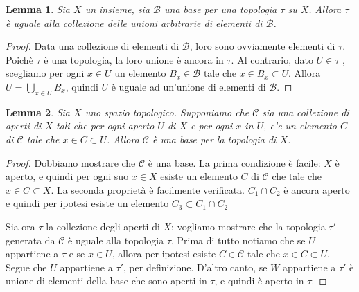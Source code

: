 \documentclass[10pt,a4paper]{article}
\theoremstyle{definition}
\theoremstyle{plain}
\newtheorem{lem}{Lemma}
\theoremstyle{remark}
\newtheorem{rem}{Remark}
\theoremstyle{remark}
\newcommand{\C}{\mathcal{C}}
\newcommand{\B}{\mathcal{B}}
\begin{document}
\begin{lem} Sia $X$ un insieme, sia $\B$ una base per una topologia $\tau$ su
$X$. Allora $\tau$ è uguale alla collezione delle unioni arbitrarie di elementi
di $\B$.
\end{lem}
\begin{proof} Data una collezione di elementi di $\B$, loro sono ovviamente
elementi di $\tau$. Poichè $\tau$ è una topologia, la loro unione è ancora in
$\tau$. Al contrario, dato $U \in \tau$ , scegliamo per ogni $x \in U$ un
elemento $B_x \in \B$ tale che $x \in B_x \subset U$. Allora $U = \bigcup_{x \in
U} B_x$, quindi $U$ è uguale ad un'unione di elementi di $\B$.
\end{proof}

%

\begin{lem}\label{baselem13.2} Sia $X$ uno spazio topologico. Supponiamo che
$\C$ sia una collezione di aperti di $X$ tali che per ogni aperto $U$ di $X$ e
per ogni $x$ in $U$, c'e un elemento $C$ di $\C$ tale che $x \in C \subset
U$. Allora $\C$ è una base per la topologia di $X$.
\end{lem}

\begin{proof} Dobbiamo mostrare che $\C$ è una base. La prima condizione è
facile: $X$ è aperto, e quindi per ogni suo $x \in X$ esiste un elemento $C$ di
$\C$ che tale che $x \in C \subset X$. La seconda proprietà è facilmente
verificata. $C_1 \cap C_2$ è ancora aperto e quindi per ipotesi esiste un
elemento $C_3 \subset C_1 \cap C_2$

Sia ora $\tau$ la collezione degli aperti di $X$; vogliamo mostrare che la
topologia $\tau'$ generata da $\C$ è uguale alla topologia $\tau$. Prima di
tutto notiamo che se $U$ appartiene a $\tau$ e se $x \in U$, allora per ipotesi
esiste $C \in \C$ tale che $x \in C \subset U$. Segue che $U$ appartiene a
$\tau'$, per definizione. D'altro canto, se $W$ appartiene a $\tau'$ è unione di
elementi della base che sono aperti in $\tau$, e quindi è aperto in $\tau$.
\end{proof}


\end{document}
